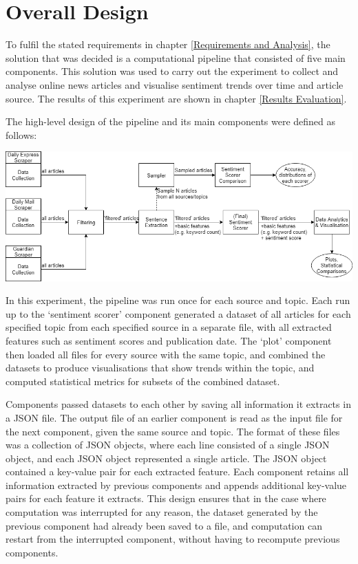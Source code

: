 \documentclass{report}
\begin{document}
\section{Overall Design} \label{Overall Design}

To fulfil the stated requirements in chapter \ref{Requirements and Analysis}, the solution that was decided is a computational pipeline that consisted of five main components.
This solution was used to carry out the experiment to collect and analyse online news articles and visualise sentiment trends over time and article source.
The results of this experiment are shown in chapter \ref{Results Evaluation}.

The high-level design of the pipeline and its main components were defined as follows:

\vspace{0.5em}
\noindent
\includegraphics[width=\textwidth]{overall-design2.png}

In this experiment, the pipeline was run once for each source and topic.
Each run up to the `sentiment scorer' component generated a dataset of all articles for each specified topic from each specified source in a separate file, with all extracted features such as sentiment scores and publication date.
The `plot' component then loaded all files for every source with the same topic, and combined the datasets to produce visualisations that show trends within the topic, and computed statistical metrics for subsets of the combined dataset.

Components passed datasets to each other by saving all information it extracts in a JSON file.
The output file of an earlier component is read as the input file for the next component, given the same source and topic.
The format of these files was a collection of JSON objects, where each line consisted of a single JSON object, and each JSON object represented a single article.
The JSON object contained a key-value pair for each extracted feature.
Each component retains all information extracted by previous components and appends additional key-value pairs for each feature it extracts.
This design ensures that in the case where computation was interrupted for any reason, the dataset generated by the previous component had already been saved to a file, and computation can restart from the interrupted component, without having to recompute previous components.
\end{document}
